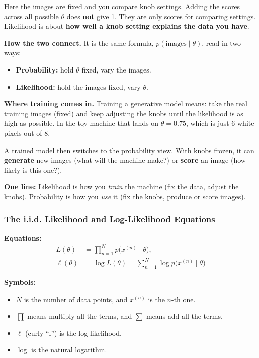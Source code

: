 Here the images are fixed and you compare knob settings. Adding the scores across all possible $\theta$ does \textbf{not} give 1. They are only scores for comparing settings. Likelihood is about \textbf{how well a knob setting explains the data you have}.

\textbf{How the two connect.} It is the same formula, $p(\text{images} \mid \theta)$, read in two ways:
\begin{itemize}
  \item \textbf{Probability:} hold $\theta$ fixed, vary the images.
  \item \textbf{Likelihood:} hold the images fixed, vary $\theta$.
\end{itemize}

\textbf{Where training comes in.} Training a generative model means: take the real training images (fixed) and keep adjusting the knobs until the likelihood is as high as possible. In the toy machine that lands on $\theta = 0.75$, which is just 6 white pixels out of 8.

A trained model then switches to the probability view. With knobs frozen, it can \textbf{generate} new images (what will the machine make?) or \textbf{score} an image (how likely is this one?).

\textbf{One line:} Likelihood is how you \emph{train} the machine (fix the data, adjust the knobs). Probability is how you \emph{use} it (fix the knobs, produce or score images).

\subsubsection*{The i.i.d. Likelihood and Log-Likelihood Equations}

\textbf{Equations:}
\begin{align*}
L(\theta) &= \prod_{n=1}^{N} p\bigl(x^{(n)} \mid \theta\bigr), \\
\ell(\theta) &= \log L(\theta) = \sum_{n=1}^{N} \log p\bigl(x^{(n)} \mid \theta\bigr)
\end{align*}

\textbf{Symbols:}
\begin{itemize}
  \item $N$ is the number of data points, and $x^{(n)}$ is the $n$-th one.
  \item $\prod$ means multiply all the terms, and $\sum$ means add all the terms.
  \item $\ell$ (curly ``l'') is the log-likelihood.
  \item $\log$ is the natural logarithm.
\end{itemize}

